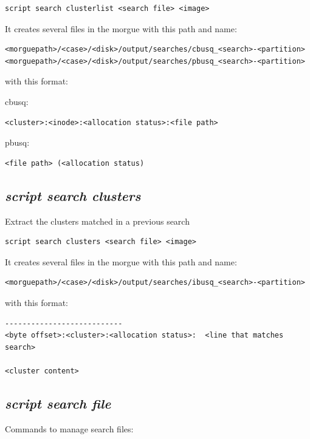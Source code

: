 \documentclass[a4paper,11pt,oneside]{report}
\begin{document}
\begin{verbatim}
script search clusterlist <search file> <image>
\end{verbatim}

It creates several files in the morgue with this path and name:

\begin{verbatim}
<morguepath>/<case>/<disk>/output/searches/cbusq_<search>-<partition>
<morguepath>/<case>/<disk>/output/searches/pbusq_<search>-<partition>
\end{verbatim}

with this format:

cbusq:
\begin{verbatim}
<cluster>:<inode>:<allocation status>:<file path>
\end{verbatim}

pbusq:
\begin{verbatim}
<file path> (<allocation status)
\end{verbatim}



\subsection{\emph{script search clusters}}

Extract the clusters matched in a previous search

\begin{verbatim}
script search clusters <search file> <image>
\end{verbatim}

It creates several files in the morgue with this path and name:

\begin{verbatim}
<morguepath>/<case>/<disk>/output/searches/ibusq_<search>-<partition>
\end{verbatim}

with this format:

\begin{verbatim}
---------------------------
<byte offset>:<cluster>:<allocation status>:  <line that matches search>

<cluster content>
\end{verbatim}


\subsection{\emph{script search file}}

Commands to manage search files:
\end{document}
